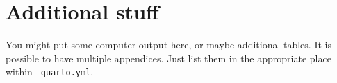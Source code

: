 \documentclass{uniexeterthesis}
\begin{document}
\cleardoublepage
{}
{}
\appendix

\hypertarget{additional-stuff}{%
\chapter{Additional stuff}\label{additional-stuff}}

You might put some computer output here, or maybe additional tables. It
is possible to have multiple appendices. Just list them in the
appropriate place within \texttt{\_quarto.yml}.
\end{document}
